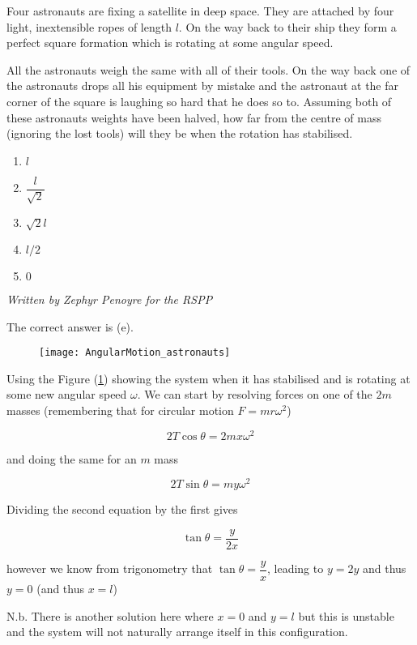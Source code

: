 \begin{problem}
{Four astronauts are fixing a satellite in deep space. They are attached by four light, inextensible ropes of length $l$. On the way back to their ship they form a perfect square formation which is rotating at some angular speed.

All the astronauts weigh the same with all of their tools. On the way back one of the astronauts drops all his equipment by mistake and the astronaut at the far corner of the square is laughing so hard that he does so to. Assuming both of these astronauts weights have been halved, how far from the centre of mass (ignoring the lost tools) will they be when the rotation has stabilised.
\begin{enumerate}
	\item $l$
	\item $\dfrac{l}{\sqrt{2}}$
	\item $\sqrt{2}l$
	\item $l/2$
	\item $0$
\end{enumerate}
  }
{\textit{Written by Zephyr Penoyre for the RSPP}}
{The correct answer is (e).

\begin{figure}[h]
\centering
\texttt{[image: AngularMotion\_astronauts]}
\caption{}
\label{fig:AngularMotion_astronauts}
\end{figure}

Using the Figure (\ref{fig:AngularMotion_astronauts}) showing the system when it has stabilised and is rotating at some new angular speed $\omega$. We can start by resolving forces on one of the $2m$ masses (remembering that for circular motion $F = mr\omega^2$)

\begin{equation*}
2T\cos{\theta} = 2mx\omega^2
\end{equation*}

and doing the same for an $m$ mass

\begin{equation*}
2T\sin{\theta} = my\omega^2
\end{equation*}

Dividing the second equation by the first gives

\begin{equation*}
\tan{\theta} = \dfrac{y}{2x}
\end{equation*}

however we know from trigonometry that $\tan{\theta} = \dfrac{y}{x}$, leading to $y = 2y$ and thus $y=0$ (and thus $x=l$)

N.b. There is another solution here where $x=0$ and $y=l$ but this is unstable and the system will not naturally arrange itself in this configuration.
}
\end{problem}